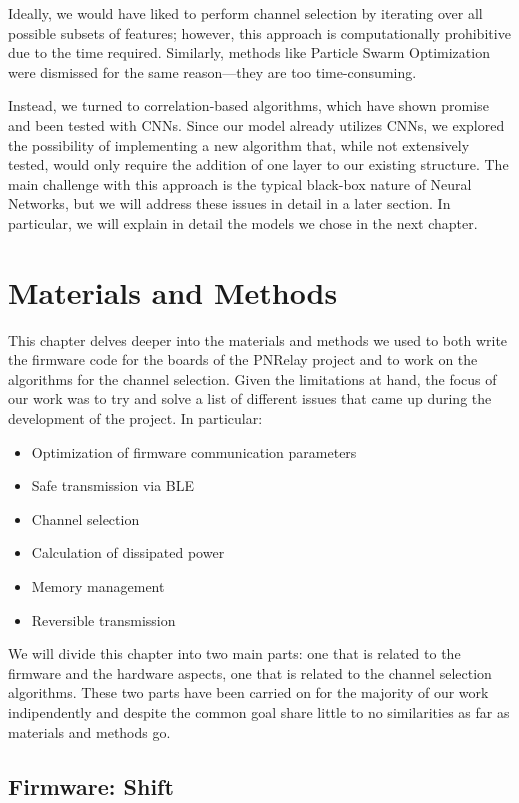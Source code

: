 \documentclass{Configuration_Files/PoliMi3i_thesis}
\begin{document}
Ideally, we would have liked to perform channel selection by iterating over all possible subsets of features; however, this approach is computationally prohibitive due to the time required. Similarly, methods like Particle Swarm Optimization were dismissed for the same reason—they are too time-consuming.

Instead, we turned to correlation-based algorithms, which have shown promise and been tested with CNNs. Since our model already utilizes CNNs, we explored the possibility of implementing a new algorithm that, while not extensively tested, would only require the addition of one layer to our existing structure. The main challenge with this approach is the typical black-box nature of Neural Networks, but we will address these issues in detail in a later section.
In particular, we will explain in detail the models we chose in the next chapter.


\chapter{Materials and Methods}
This chapter delves deeper into the materials and methods we used to both write the firmware code for the boards of the PNRelay project and to work on the algorithms for the channel selection.
Given the limitations at hand, the focus of our work was to try and solve a list of different issues that came up during the development of the project.
In particular:

\begin{itemize}
	\item Optimization of firmware communication parameters
	\item Safe transmission via BLE
	\item Channel selection
	\item Calculation of dissipated power
	\item Memory management
	\item Reversible transmission
\end{itemize}

We will divide this chapter into two main parts: one that is related to the firmware and the hardware aspects, one that is related to the channel selection algorithms.
These two parts have been carried on for the majority of our work indipendently and despite the common goal share little to no similarities as far as materials and methods go.

\section{Firmware: Shift}
\end{document}
